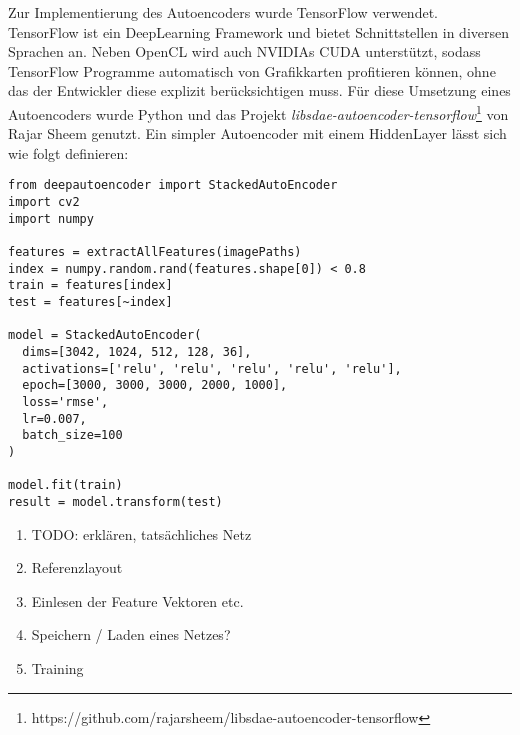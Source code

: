 Zur Implementierung des Autoencoders wurde TensorFlow verwendet. TensorFlow ist ein DeepLearning Framework und bietet Schnittstellen in diversen Sprachen an. Neben OpenCL wird auch NVIDIAs CUDA unterstützt, sodass TensorFlow Programme automatisch von Grafikkarten profitieren können, ohne das der Entwickler diese explizit berücksichtigen muss. Für diese Umsetzung eines Autoencoders wurde Python und das Projekt \textit{libsdae-autoencoder-tensorflow}\footnote{https://github.com/rajarsheem/libsdae-autoencoder-tensorflow} von Rajar Sheem genutzt. Ein simpler Autoencoder mit einem HiddenLayer lässt sich wie folgt definieren:

\lstset{language=Python}
\begin{lstlisting}
from deepautoencoder import StackedAutoEncoder
import cv2
import numpy

features = extractAllFeatures(imagePaths)
index = numpy.random.rand(features.shape[0]) < 0.8
train = features[index]
test = features[~index]

model = StackedAutoEncoder(
  dims=[3042, 1024, 512, 128, 36],
  activations=['relu', 'relu', 'relu', 'relu', 'relu'], 
  epoch=[3000, 3000, 3000, 2000, 1000], 
  loss='rmse', 
  lr=0.007, 
  batch_size=100
)

model.fit(train)
result = model.transform(test)
\end{lstlisting}

\begin{enumerate}
	\item TODO: erklären, tatsächliches Netz
	\item Referenzlayout
	\item Einlesen der Feature Vektoren etc.
	\item Speichern / Laden eines Netzes?
	\item Training
\end{enumerate}
